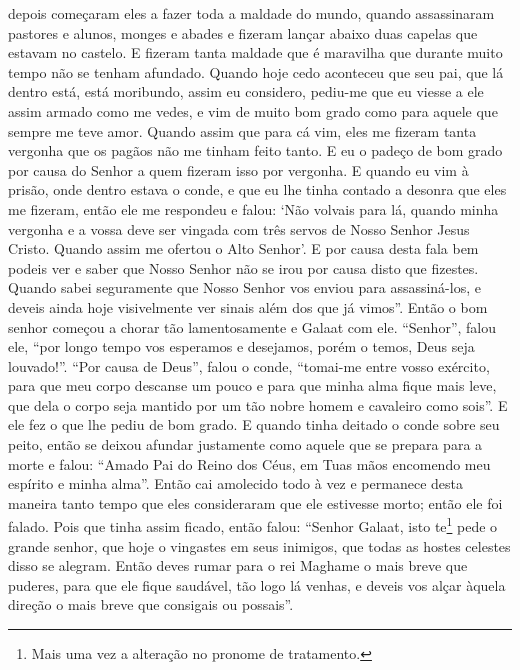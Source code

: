 depois começaram eles a fazer toda a maldade do mundo, quando assassinaram
pastores e alunos, monges e abades e fizeram lançar abaixo duas capelas que
estavam no castelo. E fizeram tanta maldade que é maravilha que durante muito
tempo não se tenham afundado. Quando hoje cedo aconteceu que seu pai, que lá
dentro está, está moribundo, assim eu considero, pediu-me que eu viesse a ele
assim armado como me vedes, e vim de muito bom grado como para aquele que
sempre me teve amor. Quando assim que para cá vim, eles me fizeram tanta
vergonha que os pagãos não me tinham feito tanto. E eu o padeço de bom grado
por causa do Senhor a quem fizeram isso por vergonha. E quando eu vim à prisão,
onde dentro estava o conde, e que eu lhe tinha contado a desonra que eles me
fizeram, então ele me respondeu e falou: ‘Não volvais para lá, quando minha
vergonha e a vossa deve ser vingada com três servos de Nosso Senhor Jesus
Cristo. Quando assim me ofertou o Alto Senhor’. E por causa desta fala bem
podeis ver e saber que Nosso Senhor não se irou por causa disto que fizestes.
Quando sabei seguramente que Nosso Senhor vos enviou para assassiná-los, e
deveis ainda hoje visivelmente ver sinais além dos que já vimos”. Então o bom 
senhor começou a chorar tão lamentosamente e Galaat com ele.
“Senhor”, falou ele, “por longo tempo vos esperamos e desejamos, porém o temos,
Deus seja louvado!”. “Por causa de Deus”, falou o conde, “tomai-me entre vosso
exército, para que meu corpo descanse um pouco e para que minha alma fique mais
leve, que dela o corpo seja mantido por um tão nobre homem e cavaleiro como
sois”. E ele fez o que lhe pediu de bom grado. E quando tinha deitado o conde
sobre seu peito, então se deixou afundar justamente como aquele que se prepara
para a morte e falou: “Amado Pai do Reino dos Céus, em Tuas mãos encomendo meu
espírito e minha alma”. Então cai amolecido todo à vez e permanece desta
maneira tanto tempo que eles consideraram que ele estivesse morto; então ele
foi falado. Pois que tinha assim ficado, então falou: “Senhor Galaat, isto
te\footnote{ Mais uma vez a alteração no pronome de tratamento.} 
pede o grande senhor, que hoje o vingastes em seus inimigos, que todas as
hostes celestes disso se alegram. Então deves rumar para o rei Maghame o mais
breve que puderes, para que ele fique saudável, tão logo lá venhas, e deveis
vos alçar àquela direção o mais breve que consigais ou possais”. 

